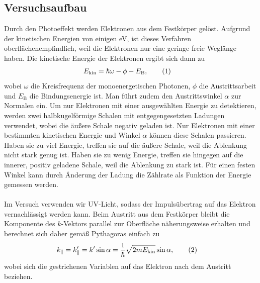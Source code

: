 \documentclass[german, parskip=full]{scrartcl}
\newcommand\numberthis{\addtocounter{equation}{1}\tag{\theequation}}
\newcommand{\tecxt}{}
\begin{document}
\subsection{Versuchsaufbau}
Durch den Photoeffekt werden Elektronen aus dem Festkörper gelöst. Aufgrund der kinetischen Energien von einigen eV, ist dieses Verfahren oberflächenempfindlich, weil die Elektronen nur eine geringe freie Weglänge haben. Die kinetische Energie der Elektronen ergibt sich dann zu 
\begin{align*}
E_\tecxt\text{kin}&=\hbar\omega - \phi - E_\tecxt\text{B},\numberthis\label{eqn:E kin von omega und phi}
\end{align*}
wobei $\omega$ die Kreisfrequenz der monoenergetischen Photonen, $\phi$ die Austrittsarbeit und $E_\tecxt\text{B}$ die Bindungsenergie ist. Man führt zudem den Austrittswinkel $\alpha$ zur Normalen ein. Um nur Elektronen mit einer ausgewählten Energie zu detektieren, werden zwei halbkugelförmige Schalen mit entgegengesetzten Ladungen verwendet, wobei die äußere Schale negativ geladen ist. Nur Elektronen mit einer bestimmten kinetischen Energie und Winkel $\alpha$ können diese Schalen passieren. Haben sie zu viel Energie, treffen sie auf die äußere Schale, weil die Ablenkung nicht stark genug ist. Haben sie zu wenig Energie, treffen sie hingegen auf die innerer, positiv geladene Schale, weil die Ablenkung zu stark ist. Für einen festen Winkel kann durch Änderung der Ladung die Zählrate als Funktion der Energie gemessen werden.\\ \\
Im Versuch verwenden wir UV-Licht, sodass der Impulsübertrag auf das Elektron vernachlässigt werden kann. Beim Austritt aus dem Festkörper bleibt die Komponente des $k$-Vektors parallel zur Oberfläche näherungsweise erhalten und berechnet sich daher gemäß Pythagoras einfach zu
\begin{align*}
k_\parallel&=k'_\parallel =k'\sin\alpha = \frac{1}{\hbar}\sqrt{2mE_\tecxt\text{kin}}\sin\alpha,\numberthis\label{eqn:k parallel von E kin}
\end{align*}
wobei sich die gestrichenen Variablen auf das Elektron nach dem Austritt beziehen.
\end{document}
